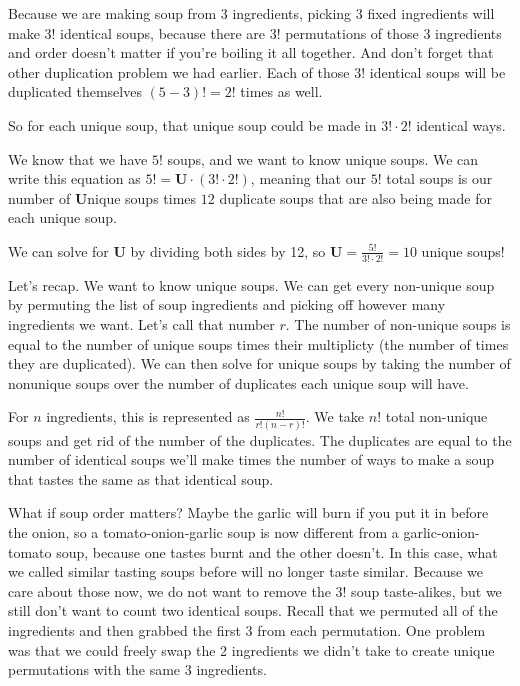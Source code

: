 \documentclass{article}
\begin{document}
    Because we are making soup from 3 ingredients, picking 3 fixed ingredients will make $3!$ identical soups, because there are $3!$ permutations of those 3 ingredients
    and order doesn't matter if you're boiling it all together.
    And don't forget that other duplication problem we had earlier.
    Each of those $3!$ identical soups will be duplicated themselves $(5-3)! = 2!$ times as well.

    So for each unique soup, that unique soup could be made in $3! \cdot 2!$ identical ways.

    We know that we have $5!$ soups, and we want to know unique soups.
    We can write this equation as $5! = \textbf{U} \cdot (3! \cdot 2!)$,
    meaning that our $5!$ total soups is our number of \textbf{U}nique soups times $12$ duplicate soups that are also being made for each unique soup.

    We can solve for \textbf{U} by dividing both sides by 12, so $\textbf{U} = \frac{5!}{3! \cdot 2!} = 10$ unique soups!

    Let's recap.
    We want to know unique soups.
    We can get every non-unique soup by permuting the list of soup ingredients and picking off however many ingredients we want.
    Let's call that number $r$.
    The number of non-unique soups is equal to the number of unique soups times their multiplicty (the number of times they are duplicated).
    We can then solve for unique soups by taking the number of nonunique soups over the number of duplicates each unique soup will have.

    For $n$ ingredients, this is represented as $\frac{n!}{r! (n - r)!}$.
    We take $n!$ total non-unique soups and get rid of the number of the duplicates.
    The duplicates are equal to the number of identical soups we'll make times the number of ways to make a soup that tastes the same as that identical soup.

    What if soup order matters?
    Maybe the garlic will burn if you put it in before the onion, so a tomato-onion-garlic soup is now different from a garlic-onion-tomato soup, because one tastes burnt and the other doesn't.
    In this case, what we called similar tasting soups before will no longer taste similar.
    Because we care about those now, we do not want to remove the $3!$ soup taste-alikes, but
    we still don't want to count two identical soups.
    Recall that we permuted all of the ingredients and then grabbed the first 3 from each permutation.
    One problem was that we could freely swap the 2 ingredients we didn't take
    to create unique permutations with the same 3 ingredients.
    
\end{document}
